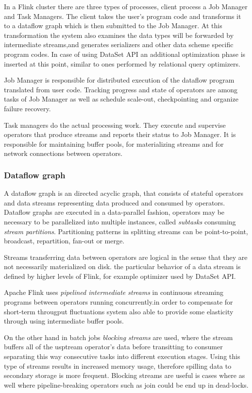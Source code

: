In a Flink cluster there are three types of processes, client process a Job Manager and Task Managers. The client takes the user's program code and transforms it to a dataflow graph which is then submitted to the Job Manager. At this transformation the system also examines the data types will be forwarded by intermediate streams,and generates serializers and other data scheme specific program codes. In case of using DataSet API an additional optimization phase is inserted at this point, similar to ones performed by relational query optimizers.

Job Manager is responsible for distributed execution of the dataflow program translated from user code. Tracking progress and state of operators are among tasks of Job Manager as well as schedule scale-out, checkpointing and organize failure recovery.

Task managers do the actual processing work. They execute and supervise operators that produce streams and reports their status to Job Manager. It is responsible for maintaining buffer pools, for materializing streams and for network connections between operators.   

\subsubsection{Dataflow graph}
A dataflow graph is an directed acyclic graph, that consists of stateful operators and data streams representing data produced and consumed by operators.
Dataflow graphs are executed in a data-parallel fashion, operators may be necessary to be parallelized into multiple instances, called \textit{subtasks} consuming \textit{stream partitions}. Partitioning patterns in splitting streams can be point-to-point, broadcast, repartition, fan-out or merge.

Streams transferring data between operators are logical in the sense that they are not necessarily materialized on disk. the particular behavior of a data stream is defined by higher levels of Flink, for example optimizer used by DataSet API.

Apache Flink uses \textit{pipelined intermediate streams} in continuous streaming programs between operators running concurrently.in order to compensate for short-term througput fluctuations system also able to provide some elasticity through using intermediate buffer pools.  

On the other hand in batch jobs \textit{blocking streams} are used, where the stream buffers all of the usptream operator's data before transitting to consumer separating this way consecutive tasks into different execution stages. Using 
 this type of streams results in increased memory usage, therefore spilling data to secondary storage is more frequent. Blocking streams are useful is cases where as well where pipeline-breaking operators such as join\cite{distributedjoin} could be end up in dead-locks.

